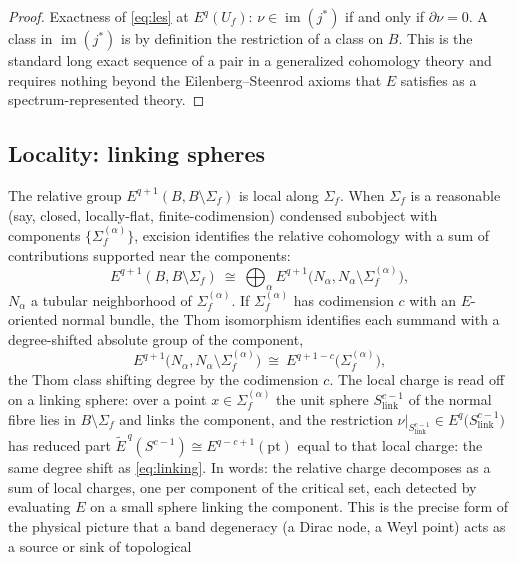 \documentclass[12pt]{article}
\newcommand{\Sig}{\Sigma}                       %
\newcommand{\im}{\operatorname{im}}
\theoremstyle{plain}
\theoremstyle{definition}
\theoremstyle{remark}
\begin{document}
\begin{proof}
Exactness of \eqref{eq:les} at $E^q(U_f)$: $\nu\in\im(j^\ast)$ if and only if
$\partial\nu=0$. A class in $\im(j^\ast)$ is by definition the restriction of a class on
$B$. This is the standard long exact sequence of a pair in a generalized cohomology
theory and requires nothing beyond the Eilenberg--Steenrod axioms that $E$ satisfies as
a spectrum-represented theory.
\end{proof}

\subsection{Locality: linking spheres}
\label{sec:linking}

The relative group $E^{q+1}(B,B\setminus\Sig_f)$ is local along $\Sig_f$. When $\Sig_f$
is a reasonable (say, closed, locally-flat, finite-codimension) condensed subobject with
components $\{\Sig_f^{(\alpha)}\}$, excision identifies the relative cohomology with a sum
of contributions supported near the components:
\begin{equation}
\label{eq:excision}
E^{q+1}(B,B\setminus\Sig_f)\ \cong\ \bigoplus_\alpha E^{q+1}\bigl(N_\alpha,N_\alpha\setminus\Sig_f^{(\alpha)}\bigr),
\end{equation}
$N_\alpha$ a tubular neighborhood of $\Sig_f^{(\alpha)}$. If $\Sig_f^{(\alpha)}$ has
codimension $c$ with an $E$-oriented normal bundle, the Thom isomorphism identifies each
summand with a degree-shifted absolute group of the component,
\begin{equation}
\label{eq:linking}
E^{q+1}\bigl(N_\alpha,N_\alpha\setminus\Sig_f^{(\alpha)}\bigr)\ \cong\
E^{q+1-c}\bigl(\Sig_f^{(\alpha)}\bigr),
\end{equation}
the Thom class shifting degree by the codimension $c$. The local charge is read off on a
linking sphere: over a point $x\in\Sig_f^{(\alpha)}$ the unit sphere $S^{c-1}_{\mathrm{link}}$
of the normal fibre lies in $B\setminus\Sig_f$ and links the component, and the restriction
$\nu|_{S^{c-1}_{\mathrm{link}}}\in E^{q}\bigl(S^{c-1}_{\mathrm{link}}\bigr)$ has reduced part
$\widetilde E^{\,q}(S^{c-1})\cong E^{q-c+1}(\mathrm{pt})$ equal to that local charge: the
same degree shift as \eqref{eq:linking}. In words: the relative charge decomposes as a sum
of local charges, one per component of the critical set, each detected by evaluating $E$ on
a small sphere linking the component. This is the precise form of the physical picture that
a band degeneracy (a Dirac node, a Weyl point) acts as a source or sink of topological
\end{document}
